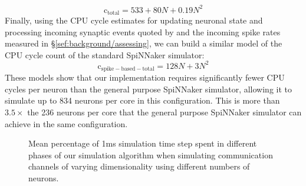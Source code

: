 \documentclass[conference]{IEEEtran}
\begin{document}
%
\begin{equation}
  \mathrm{c}_\mathrm{total} = 533 + 80 N + 0.19 N^{2}\label{eq:profiling_total_eliasmith}
\end{equation}
%
Finally, using the CPU cycle estimates for updating neuronal state and processing incoming synaptic events quoted by \textcite{Sharp2013} and the incoming spike rates measured in \S\ref{sef:background/assessing}, we can build a similar model of the CPU cycle count of the standard SpiNNaker simulator:
%
\begin{equation}
  \mathrm{c}_\mathrm{spike-based-total} = 128N + 3 N^{2}\label{eq:profiling_spike_based_total}
\end{equation}
% 
These models show that our implementation requires significantly fewer CPU cycles per neuron than the general purpose SpiNNaker simulator, allowing it to simulate up to 834 neurons per core in this configuration. 
This is more than $3.5 \times$ the 236 neurons per core that the general purpose SpiNNaker simulator can achieve in the same configuration.


  \begin{figure}[!t]
    \centering
    \hfil
    \caption{Mean percentage of 1ms simulation time step spent in different phases of our simulation algorithm when simulating communication channels of varying dimensionality using different numbers of neurons.}
    \label{fig:results/comm-channel-cpu}
  \end{figure}
\end{document}

